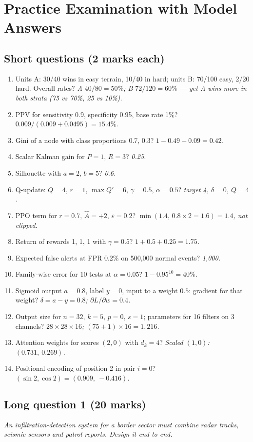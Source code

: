 \documentclass[11pt]{article}
\begin{document}
\section{Practice Examination with Model Answers}
\subsection{Short questions (2 marks each)}
\begin{enumerate}
\item Units A: 30/40 wins in easy terrain, 10/40 in hard; units B: 70/100 easy, 2/20 hard. Overall rates? \emph{A $40/80=50\%$; B $72/120=60\%$ --- yet A wins more in both strata (75 vs 70\%, 25 vs 10\%).}
\item PPV for sensitivity 0.9, specificity 0.95, base rate 1\%? \emph{$0.009/(0.009+0.0495)=15.4\%$.}
\item Gini of a node with class proportions 0.7, 0.3? \emph{$1-0.49-0.09=0.42$.}
\item Scalar Kalman gain for $P=1$, $R=3$? \emph{0.25.}
\item Silhouette with $a=2$, $b=5$? \emph{0.6.}
\item Q-update: $Q=4$, $r=1$, $\max Q'=6$, $\gamma=0.5$, $\alpha=0.5$? \emph{target 4, $\delta=0$, $Q=4$.}
\item PPO term for $r=0.7$, $\hat A=+2$, $\varepsilon=0.2$? \emph{$\min(1.4,\,0.8\times2=1.6)=1.4$, not clipped.}
\item Return of rewards 1, 1, 1 with $\gamma=0.5$? \emph{$1+0.5+0.25=1.75$.}
\item Expected false alerts at FPR 0.2\% on 500,000 normal events? \emph{1,000.}
\item Family-wise error for 10 tests at $\alpha=0.05$? \emph{$1-0.95^{10}=40\%$.}
\item Sigmoid output $a=0.8$, label $y=0$, input to a weight $0.5$: gradient for that weight? \emph{$\delta=a-y=0.8$; $\partial L/\partial w=0.4$.}
\item Output size for $n=32$, $k=5$, $p=0$, $s=1$; parameters for 16 filters on 3 channels? \emph{$28\times28\times16$; $(75+1)\times16=1{,}216$.}
\item Attention weights for scores $(2,0)$ with $d_k=4$? \emph{Scaled $(1,0)$: $(0.731,\ 0.269)$.}
\item Positional encoding of position 2 in pair $i=0$? \emph{$(\sin2,\cos2)=(0.909,\ -0.416)$.}
\end{enumerate}

\subsection{Long question 1 (20 marks)}
\emph{An infiltration-detection system for a border sector must combine radar tracks, seismic sensors and patrol reports. Design it end to end.}
\end{document}
